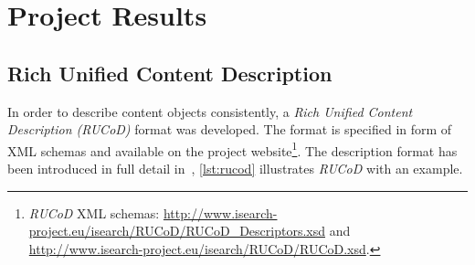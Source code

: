 \documentclass{acm_proc_article-sp}
\let\oldemph\emph
\renewcommand{\emph}[1]{\oldemph{\fontsize{9}{9}\selectfont #1}}
\newcommand{\inlinelistingsize}{\fontsize{8pt}{11pt}}
\let\oldurl\url
\renewcommand{\url}[1]{\inlinelistingsize\oldurl{#1}}
\begin{document}
\section{Project Results} \label{sec:projectresults}

\subsection{Rich Unified Content Description}
In order to describe content objects consistently, a \emph{Rich Unified Content Description (RUCoD)} format was developed.
The format is specified in form of XML schemas and available on the project website\footnote{\emph{RUCoD} XML schemas: \url{http://www.isearch-project.eu/isearch/RUCoD/RUCoD_Descriptors.xsd} and \url{http://www.isearch-project.eu/isearch/RUCoD/RUCoD.xsd}.}.
The description format has been introduced in full detail in~\cite{ijmis2010}, \autoref{lst:rucod} illustrates \emph{RUCoD} with an example.
\end{document}
